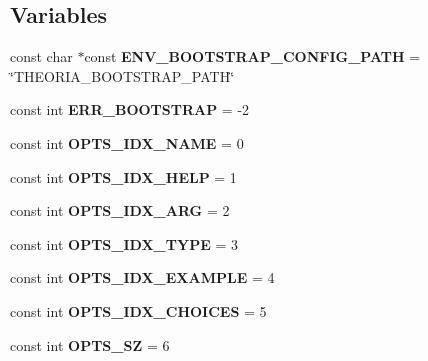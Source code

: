 \subsection*{Variables}
\begin{DoxyCompactItemize}
\item 
\mbox{\label{namespacetheoria_a2a959c9e66a0135d5f99332642f6815e}} 
const char $\ast$const {\bfseries E\+N\+V\+\_\+\+B\+O\+O\+T\+S\+T\+R\+A\+P\+\_\+\+C\+O\+N\+F\+I\+G\+\_\+\+P\+A\+TH} = \char`\"{}T\+H\+E\+O\+R\+I\+A\+\_\+\+B\+O\+O\+T\+S\+T\+R\+A\+P\+\_\+\+P\+A\+TH\char`\"{}
\item 
\mbox{\label{namespacetheoria_a4427bfe4c1771361b961393d52ae8cfd}} 
const int {\bfseries E\+R\+R\+\_\+\+B\+O\+O\+T\+S\+T\+R\+AP} = -\/2
\item 
\mbox{\label{namespacetheoria_a34f7269de13b8f576a72afc12e59a880}} 
const int {\bfseries O\+P\+T\+S\+\_\+\+I\+D\+X\+\_\+\+N\+A\+ME} = 0
\item 
\mbox{\label{namespacetheoria_a9133a4566be1cd42d5d082a923054c79}} 
const int {\bfseries O\+P\+T\+S\+\_\+\+I\+D\+X\+\_\+\+H\+E\+LP} = 1
\item 
\mbox{\label{namespacetheoria_a9b5f7da2bf9eeacfbb27c4cd62139f1c}} 
const int {\bfseries O\+P\+T\+S\+\_\+\+I\+D\+X\+\_\+\+A\+RG} = 2
\item 
\mbox{\label{namespacetheoria_ac650aebc62d28bc7dcc33e589b0731ef}} 
const int {\bfseries O\+P\+T\+S\+\_\+\+I\+D\+X\+\_\+\+T\+Y\+PE} = 3
\item 
\mbox{\label{namespacetheoria_a667f962fdb5023b71417fc4d0d313159}} 
const int {\bfseries O\+P\+T\+S\+\_\+\+I\+D\+X\+\_\+\+E\+X\+A\+M\+P\+LE} = 4
\item 
\mbox{\label{namespacetheoria_a2548c16ea9d8d9cfcdb25060c745e188}} 
const int {\bfseries O\+P\+T\+S\+\_\+\+I\+D\+X\+\_\+\+C\+H\+O\+I\+C\+ES} = 5
\item 
\mbox{\label{namespacetheoria_a977122a149e2e024858359270fe404d2}} 
const int {\bfseries O\+P\+T\+S\+\_\+\+SZ} = 6
\item 

\end{DoxyCompactItemize}
